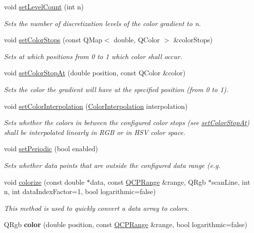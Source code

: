\begin{DoxyCompactItemize}
\item 
void \hyperlink{classQCPColorGradient_a18da587eb4f7fc788ea28ba15b6a12de}{set\+Level\+Count} (int n)
\begin{DoxyCompactList}\small\item\em Sets the number of discretization levels of the color gradient to {\itshape n}. \end{DoxyCompactList}\item 
void \hyperlink{classQCPColorGradient_a724e828aa6f0ba5011a9392477c35d3a}{set\+Color\+Stops} (const Q\+Map$<$ double, Q\+Color $>$ \&color\+Stops)
\begin{DoxyCompactList}\small\item\em Sets at which positions from 0 to 1 which color shall occur. \end{DoxyCompactList}\item 
void \hyperlink{classQCPColorGradient_a3b48be5e78079db1bb2a1188a4c3390e}{set\+Color\+Stop\+At} (double position, const Q\+Color \&color)
\begin{DoxyCompactList}\small\item\em Sets the {\itshape color} the gradient will have at the specified {\itshape position} (from 0 to 1). \end{DoxyCompactList}\item 
void \hyperlink{classQCPColorGradient_aa13fda86406e1d896a465a409ae63b38}{set\+Color\+Interpolation} (\hyperlink{classQCPColorGradient_ac5dca17cc24336e6ca176610e7f77fc1}{Color\+Interpolation} interpolation)
\begin{DoxyCompactList}\small\item\em Sets whether the colors in between the configured color stops (see \hyperlink{classQCPColorGradient_a3b48be5e78079db1bb2a1188a4c3390e}{set\+Color\+Stop\+At}) shall be interpolated linearly in R\+G\+B or in H\+S\+V color space. \end{DoxyCompactList}\item 
void \hyperlink{classQCPColorGradient_a39d6448155fc00a219f239220d14bb39}{set\+Periodic} (bool enabled)
\begin{DoxyCompactList}\small\item\em Sets whether data points that are outside the configured data range (e.\+g. \end{DoxyCompactList}\item 
void \hyperlink{classQCPColorGradient_aaf423ceb943e177b0ed2c48c811d83dc}{colorize} (const double $\ast$data, const \hyperlink{classQCPRange}{Q\+C\+P\+Range} \&range, Q\+Rgb $\ast$scan\+Line, int n, int data\+Index\+Factor=1, bool logarithmic=false)
\begin{DoxyCompactList}\small\item\em This method is used to quickly convert a {\itshape data} array to colors. \end{DoxyCompactList}\item 
\hypertarget{classQCPColorGradient_a0599545c859268b025d2060dea741cea}{}Q\+Rgb {\bfseries color} (double position, const \hyperlink{classQCPRange}{Q\+C\+P\+Range} \&range, bool logarithmic=false)\label{classQCPColorGradient_a0599545c859268b025d2060dea741cea}


\end{DoxyCompactItemize}
